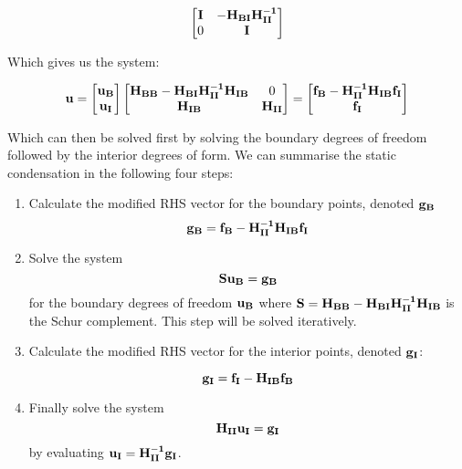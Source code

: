 \begin{equation}
\begin{bmatrix}
{\bf{I}} &  {\bf{-H_{BI}H_{II}^{-1}}}\\
0 &  {\bf{I}} 
  \end{bmatrix}
\end{equation}

Which gives us the system:

\begin{equation}
{\bf{u}} = 
\begin{bmatrix}
{\bf{u_B}} \\
{\bf{u_I}}
  \end{bmatrix}
\begin{bmatrix}
{\bf{H_{BB} - H_{BI} H_{II}^{-1}H_{IB}}} &  0\\
{\bf{H_{IB}}} &  {\bf{H_{II}}} 
  \end{bmatrix}
=
\begin{bmatrix}
{\bf{f_B - H_{II}^{-1}H_{IB}f_I}} \\
{\bf{f_I}}
  \end{bmatrix}
\end{equation}

Which can then be solved first by solving the boundary degrees of freedom followed by the interior degrees of form. We can summarise the static condensation in the following four steps:

\begin{enumerate}
\item Calculate the modified RHS vector for the boundary points, denoted \(\bf{g_B}\) 
\begin{equation}
{\bf{g_B}} = {\bf{f_B - H_{II}^{-1}H_{IB}f_I}}
\end{equation}

\item Solve the system
\begin{equation}
{\bf{Su_B}} = {\bf{g_B}}
\end{equation}
for the boundary degrees of freedom \(\bf{u_B}\) where \(\bf{S = H_{BB} - H_{BI} H_{II}^{-1}H_{IB}}\) is the Schur complement. This step will be solved iteratively.

\item Calculate the modified RHS vector for the interior points, denoted \(\bf{g_I}\):

\begin{equation}
{\bf{g_I}} = {\bf{f_I - H_{IB}f_B}}
\end{equation}

\item Finally solve the system
\begin{equation}
\bf{H_{II}u_I} = \bf{g_I}
\end{equation}
by evaluating \(\bf{u_I} = \bf{H_{II}^{-1}g_I}\).
\end{enumerate}

